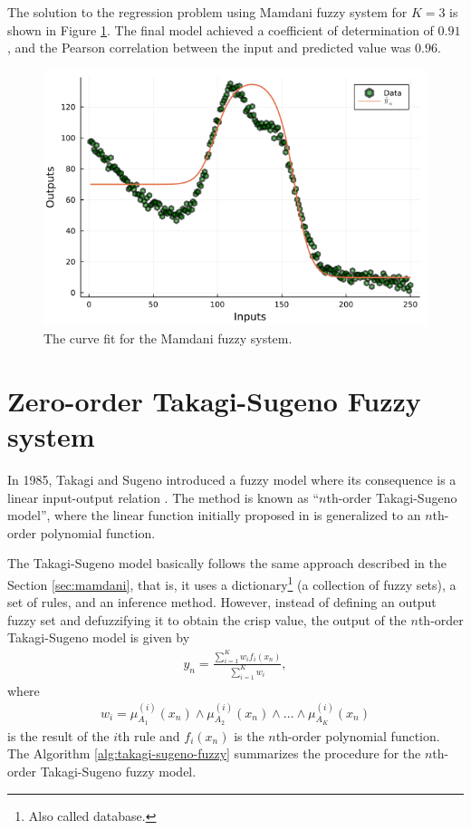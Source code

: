 \documentclass[english]{sobraep}
\begin{document}
The solution to the regression problem using Mamdani fuzzy system for \(K=3\) is shown in Figure \ref{fig:mamdani-fuzzy-regression}. The final model achieved a coefficient of determination of \(0.91\), and the Pearson correlation between the input and predicted value was \(0.96\).

\begin{figure}[H]
    \centering
    \includegraphics[scale=0.4]{../figs/mamdani_fuzzy/fuzzy_prediction.png}
    \caption{The curve fit for the Mamdani fuzzy system.}
    \label{fig:mamdani-fuzzy-regression}
\end{figure}

\section*{Zero-order Takagi-Sugeno Fuzzy system}

In 1985, Takagi and Sugeno introduced a fuzzy model where its consequence is a linear input-output relation \cite{takagi1985fuzzy}. The method is known as ``\(n\)th-order Takagi-Sugeno model'', where the linear function initially proposed in \cite{takagi1985fuzzy} is generalized to an \(n\)th-order polynomial function.

The Takagi-Sugeno model basically follows the same approach described in the Section \ref{sec:mamdani}\;\;\;, that is, it uses a dictionary\footnote{Also called database.} (a collection of fuzzy sets), a set of rules, and an inference method. However, instead of defining an output fuzzy set and defuzzifying it to obtain the crisp value, the output of the \(n\)th-order Takagi-Sugeno model is given by
\begin{align}
    y_n = \frac{\sum_{i=1}^{K} w_if_i(x_n)}{\sum_{i=1}^{K} w_i},
\end{align}
where
\begin{align}
    w_i = \mu_{A_1}^{(i)} (x_n) \wedge \mu_{A_2}^{(i)} (x_n) \wedge \dots \wedge \mu_{A_K}^{(i)} (x_n)
    \label{eq:w_i}
\end{align}
is the result of the \(i\)th rule and \(f_i(x_n)\) is the \(n\)th-order polynomial function. The Algorithm \ref{alg:takagi-sugeno-fuzzy} summarizes the procedure for the \(n\)th-order Takagi-Sugeno fuzzy model.
\end{document}
